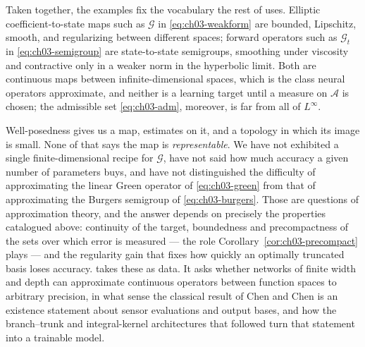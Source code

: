 Taken together, the examples fix the vocabulary the rest of
 uses. Elliptic
coefficient-to-state maps such as $\mathcal{G}$ in \eqref{eq:ch03-weakform} are
bounded, Lipschitz, smooth, and regularizing between different spaces; forward
operators such as $\mathcal{G}_t$ in \eqref{eq:ch03-semigroup} are state-to-state
semigroups, smoothing under viscosity and contractive only in a weaker norm in
the hyperbolic limit. Both are continuous maps between infinite-dimensional
spaces, which is the class neural operators approximate,
and neither is a learning target until a measure on $\mathcal{A}$ is chosen; the
admissible set \eqref{eq:ch03-adm}, moreover, is far from all of $L^\infty$.

Well-posedness gives us a map, estimates on it, and a topology in which its
image is small. None of that says the map is \emph{representable}. We have not
exhibited a single finite-dimensional recipe for $\mathcal{G}$, have not said how
much accuracy a given number of parameters buys, and have not distinguished the
difficulty of approximating the linear Green operator of \eqref{eq:ch03-green}
from that of approximating the Burgers semigroup of \eqref{eq:ch03-burgers}. Those
are questions of approximation theory, and the answer depends on precisely the
properties catalogued above: continuity of the target, boundedness and
precompactness of the sets over which error is measured --- the role
Corollary~\ref{cor:ch03-precompact} plays --- and the regularity gain that fixes
how quickly an optimally truncated basis loses accuracy. 
takes these as data. It asks whether networks of finite width and depth can
approximate continuous operators between function spaces to arbitrary precision,
in what sense the classical result of Chen and Chen is an existence statement
about sensor evaluations and output bases, and how the branch--trunk and
integral-kernel architectures that followed turn that statement into a trainable
model.
